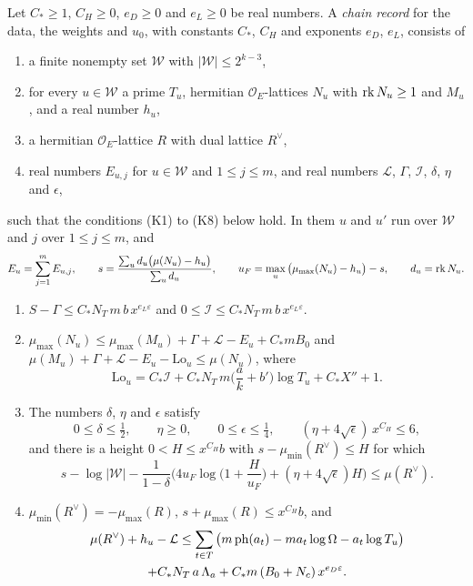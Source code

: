 \begin{definition}\label{r6:R6:def:record}
Let $C_\ast\ge1$, $C_H\ge0$, $e_D\ge0$ and $e_L\ge0$ be real numbers. A \emph{chain record} for the data, the weights and $u_0$, with constants $C_\ast$, $C_H$ and exponents $e_D$, $e_L$, consists of
\begin{enumerate}
\item[(a)] a finite nonempty set $\mathcal W$ with $\lvert\mathcal W\rvert\le2^{k-3}$,
\item[(b)] for every $u\in\mathcal W$ a prime $T_u$, hermitian $\mathcal O_E$-lattices $N_u$ with $\operatorname{rk} N_u\ge1$ and $M_u$, and a real number $h_u$,
\item[(c)] a hermitian $\mathcal O_E$-lattice $R$ with dual lattice $R^\vee$,
\item[(d)] real numbers $E_{u,j}$ for $u\in\mathcal W$ and $1\le j\le m$, and real numbers $\mathcal L$, $\Gamma$, $\mathcal I$, $\delta$, $\eta$ and $\epsilon$,
\end{enumerate}
such that the conditions (K1) to (K8) below hold. In them $u$ and $u'$ run over $\mathcal W$ and $j$ over $1\le j\le m$, and
\[
E_u=\sum_{j=1}^mE_{u,j},\qquad s=\frac{\sum_ud_u\big(\mu(N_u)-h_u\big)}{\sum_ud_u},\qquad u_F=\max_u\big(\mu_{\max}(N_u)-h_u\big)-s,\qquad d_u=\operatorname{rk} N_u .
\]
\begin{enumerate}
\item[(K1)] $S-\Gamma\le C_\ast N_T\,m\,b\,x^{e_L\varepsilon}$ and $0\le\mathcal I\le C_\ast N_T\,m\,b\,x^{e_L\varepsilon}$.
\item[(K2)] $\mu_{\max}(N_u)\le\mu_{\max}(M_u)+\Gamma+\mathcal L-E_u+C_\ast m B_0$ and $\mu(M_u)+\Gamma+\mathcal L-E_u-\mathrm{Lo}_u\le\mu(N_u)$, where
\[
\mathrm{Lo}_u=C_\ast\mathcal I+C_\ast N_T\,m\Big(\frac ak+b'\Big)\log T_u+C_\ast X''+1 .
\]
\item[(K3)] The numbers $\delta$, $\eta$ and $\epsilon$ satisfy
\[
0\le\delta\le\tfrac12,\qquad\eta\ge0,\qquad0\le\epsilon\le\tfrac14,\qquad(\eta+4\sqrt\epsilon)\,x^{C_H}\le6,
\]
and there is a height $0<H\le x^{C_H}b$ with $s-\mu_{\min}(R^\vee)\le H$ for which
\[
s-\log\lvert\mathcal W\rvert-\frac1{1-\delta}\Big(4u_F\log\Big(1+\frac H{u_F}\Big)+(\eta+4\sqrt\epsilon)H\Big)\le\mu(R^\vee).
\]
\item[(K4)] $\mu_{\min}(R^\vee)=-\mu_{\max}(R)$, $s+\mu_{\max}(R)\le x^{C_H}b$, and
\begin{multline*}
\mu(R^\vee)+h_u-\mathcal L\le\sum_{t\in T}\big(m\ph(a_t)-ma_t\log\Omega-a_t\log T_u\big)\\
+C_\ast N_T\,a\,\Lambda_a+C_\ast m\,(B_0+N_c)\,x^{e_D\varepsilon}.

\end{multline*}
\end{enumerate}
\end{definition}
